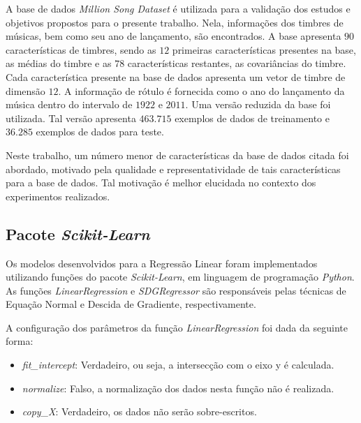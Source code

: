 \documentclass[conference]{IEEEtran}
\begin{document}
A base de dados \emph{Million Song Dataset} é utilizada para a validação dos estudos e objetivos propostos para o presente trabalho. Nela, informações dos timbres de músicas, bem como seu ano de lançamento, são encontrados.  A base apresenta $90$ características de timbres, sendo as $12$ primeiras características presentes na base, as médias do timbre e as $78$ características restantes, as covariâncias do timbre. Cada característica presente na base de dados apresenta um vetor de timbre de dimensão $12$. A informação de rótulo é fornecida como o ano do lançamento da música dentro do intervalo de $1922$ e $2011$. Uma versão reduzida da base foi utilizada. Tal versão apresenta $463.715$ exemplos de dados de treinamento e $36.285$ exemplos de dados para teste.

Neste trabalho, um número menor de características da base de dados citada foi abordado, motivado pela qualidade e representatividade de tais características para a base de dados. Tal motivação é melhor elucidada no contexto dos experimentos realizados.

\subsection{Pacote \textit{Scikit-Learn}} \label{sec:base}

Os modelos desenvolvidos para a Regressão Linear foram implementados utilizando funções do pacote \emph{Scikit-Learn}, em linguagem de programação \emph{Python}. As funções \emph{LinearRegression} e \emph{SDGRegressor} são responsáveis pelas técnicas de Equação Normal\cite{b1} e Descida de Gradiente, respectivamente.

A configuração dos parâmetros da função \emph{LinearRegression} foi dada da seguinte forma:
\begin{itemize}
	\item \textit{fit\_intercept}: Verdadeiro, ou seja, a intersecção com o eixo y é calculada.
	\item \textit{normalize}: Falso, a normalização dos dados nesta função não é realizada.
	\item \textit{copy\_X}: Verdadeiro, os dados não serão sobre-escritos.
\end{itemize}
\end{document}
